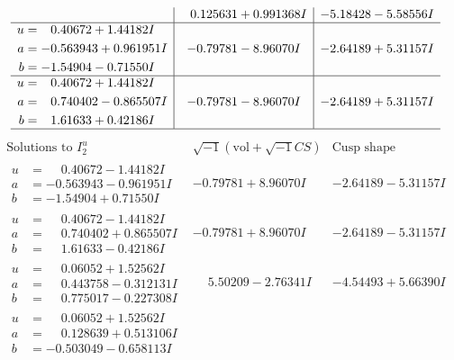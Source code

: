 \documentclass[1p]{elsarticle_modified}
\theoremstyle{definition}
\newcommand{\I}{\sqrt{-1}}
\begin{document}
$$\begin{array}{c|c|c}
 & \phantom{-}0.125631 + 0.991368 I & -5.18428 - 5.58556 I \\ \hline\begin{aligned}
u &= \phantom{-}0.40672 + 1.44182 I \\
a &= -0.563943 + 0.961951 I \\
b &= -1.54904 - 0.71550 I\end{aligned}
 & -0.79781 - 8.96070 I & -2.64189 + 5.31157 I \\ \hline\begin{aligned}
u &= \phantom{-}0.40672 + 1.44182 I \\
a &= \phantom{-}0.740402 - 0.865507 I \\
b &= \phantom{-}1.61633 + 0.42186 I\end{aligned}
 & -0.79781 - 8.96070 I & -2.64189 + 5.31157 I\\
 \hline 
 \end{array}$$\newpage$$\begin{array}{c|c|c}  
\text{Solutions to }I^u_{2}& \I (\text{vol} + \sqrt{-1}CS) & \text{Cusp shape}\\
 \hline 
\begin{aligned}
u &= \phantom{-}0.40672 - 1.44182 I \\
a &= -0.563943 - 0.961951 I \\
b &= -1.54904 + 0.71550 I\end{aligned}
 & -0.79781 + 8.96070 I & -2.64189 - 5.31157 I \\ \hline\begin{aligned}
u &= \phantom{-}0.40672 - 1.44182 I \\
a &= \phantom{-}0.740402 + 0.865507 I \\
b &= \phantom{-}1.61633 - 0.42186 I\end{aligned}
 & -0.79781 + 8.96070 I & -2.64189 - 5.31157 I \\ \hline\begin{aligned}
u &= \phantom{-}0.06052 + 1.52562 I \\
a &= \phantom{-}0.443758 - 0.312131 I \\
b &= \phantom{-}0.775017 - 0.227308 I\end{aligned}
 & \phantom{-}5.50209 - 2.76341 I & -4.54493 + 5.66390 I \\ \hline\begin{aligned}
u &= \phantom{-}0.06052 + 1.52562 I \\
a &= \phantom{-}0.128639 + 0.513106 I \\
b &= -0.503049 - 0.658113 I\end{aligned}

\end{array}$$
\end{document}
